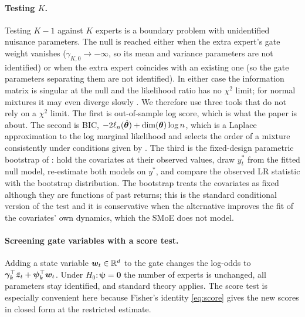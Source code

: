\paragraph{Testing $K$.}
Testing $K-1$ against $K$ experts is a boundary problem with unidentified nuisance parameters. The
null is reached either when the extra expert's gate weight vanishes ($\gamma_{K,0}\to-\infty$, so its
mean and variance parameters are not identified) or when the extra expert coincides with an
existing one (so the gate parameters separating them are not identified). In either case the
information matrix is singular at the null and the likelihood ratio has no $\chi^2$ limit; for
normal mixtures it may even diverge slowly \citep{hartigan1985failure,chen2001modified}. We therefore
use three tools that do not rely on a $\chi^2$ limit. The first is out-of-sample log score, which is
what the paper is about. The second is BIC, $-2\ell_n(\hat{\bm{\theta}})+\dim(\bm{\theta})\log n$, which is a
Laplace approximation to the log marginal likelihood \citep{schwarz1978estimating} and selects the
order of a mixture consistently under conditions given by \citet{keribin2000consistent}. The third
is the fixed-design parametric bootstrap of \citet{mclachlan1987bootstrapping}: hold the covariates
at their observed values, draw $y^\ast_t$ from the fitted null model, re-estimate both models on
$y^\ast$, and compare the observed LR statistic with the bootstrap distribution. The bootstrap
treats the covariates as fixed although they are functions of past returns; this is the standard
conditional version of the test and it is conservative when the alternative improves the fit of
the covariates' own dynamics, which the SMoE does not model.

\paragraph{Screening gate variables with a score test.}
Adding a state variable $\bm w_t\in\mathbb{R}^d$ to the gate changes the log-odds to
$\bm\gamma_k^\top\tilde{\bm{z}}_t+\bm\psi_k^\top\bm w_t$. Under $H_0:\bm\psi=\bm 0$ the number of
experts is unchanged, all parameters stay identified, and standard theory applies. The score test
is especially convenient here because Fisher's identity \eqref{eq:score} gives the new scores in
closed form at the restricted estimate.

